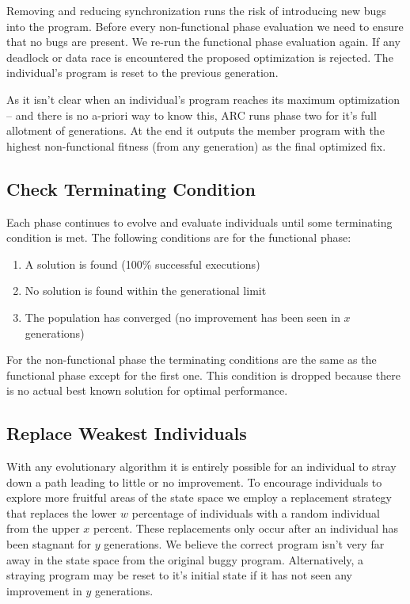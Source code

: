 \documentclass{llncs}
\begin{document}
Removing and reducing synchronization runs the risk of introducing new bugs
into the program. Before every non-functional phase evaluation we need to
ensure that no bugs are present. We re-run the functional phase evaluation
again. If any deadlock or data race is encountered the proposed optimization is
rejected. The individual's program is reset to the previous generation.

As it isn't clear when an individual's program reaches its maximum optimization
-- and there is no a-priori way to know this, ARC runs phase two for it's full
allotment of generations. At the end it outputs the member program with the
highest non-functional fitness (from any generation) as the final optimized
fix.

\subsection{Check Terminating Condition}
\label{sec:check_terminating_condition}

Each phase continues to evolve and evaluate individuals until some terminating
condition is met. The following conditions are for the functional phase:

\begin{enumerate}
  \item A solution is found (100\% successful executions)
  \item No solution is found within the generational limit
  \item The population has converged (no improvement has been seen in $x$
  generations)
\end{enumerate}

For the non-functional phase the terminating conditions are the same as the
functional phase except for the first one. This condition is dropped because
there is no actual best known solution for optimal performance.

\subsection{Replace Weakest Individuals}
\label{sec:replace_weakest_individuals}

With any evolutionary algorithm it is entirely possible for an individual to
stray down a path leading to little or no improvement. To encourage individuals
to explore more fruitful areas of the state space we employ a replacement
strategy that replaces the lower $w$ percentage of individuals with a random
individual from the upper $x$ percent. These replacements only occur after an
individual has been stagnant for $y$ generations. We believe the correct
program isn't very far away in the state space from the original buggy program.
Alternatively, a straying program may be reset to it's initial state if it has
not seen any improvement in $y$ generations.
\end{document}

